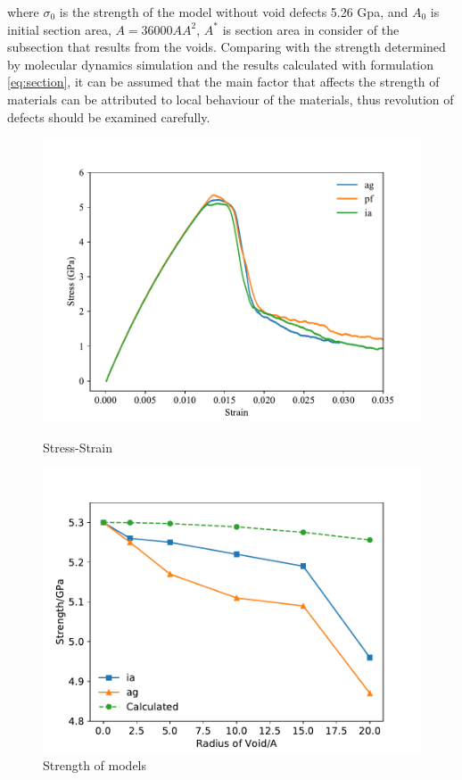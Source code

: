 \documentclass[metals,article,submit,moreauthors,pdftex,10pt,a4paper]{Definitions/mdpi}
\begin{document}
where $\sigma_0$ is the strength of the model without void defects 5.26 Gpa, and $A_0$ is initial section area, $ A = 36000 {AA}^2$, $A^* $ is section area in consider of the subsection that results from the voids. Comparing with the strength determined by molecular dynamics simulation and the results calculated with formulation \ref{eq:section}, it can be assumed that the main factor that affects the strength of materials can be attributed to local behaviour of the materials, thus revolution of defects should be examined carefully.

\begin{figure}[ht]
	\centering
	\begin{minipage}{0.495\textwidth}
		\includegraphics[width=1\linewidth]{img/allline}
		\centering
		\caption{Stress-Strain}
		\label{fig:stress&strain}
	\end{minipage}	
	\hfill
	\begin{minipage}{0.495\textwidth}		
		\includegraphics[width=1\linewidth]{img/effect_of_vol}
		\centering
		\caption{Strength of models}
		\label{fig:strength}
	\end{minipage}
\end{figure}
\end{document}
